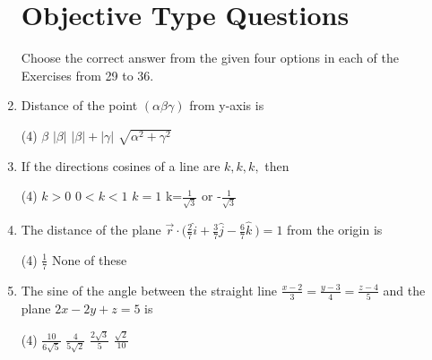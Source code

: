 \documentclass[12pt]{article}
\begin{document}
\begin{enumerate}
\section*{Objective Type Questions}
Choose the correct answer from the given four options in each of the Exercises from 29 to 36.

\item Distance of the point $(\alpha \beta \gamma)$ from y-axis is
\begin{tasks}(4)
	\task $\beta$ 
	\task $|\beta|$
	\task $|\beta|+|\gamma|$
	\task $\sqrt{\alpha^2+\gamma^2}$
\end{tasks}
\item If the directions cosines of a line are $k,k,k,$ then
\begin{tasks}(4)
	\task $k>0$
	\task $0<k<1$
	\task $k=1$
	\task k=\(\displaystyle \frac{1}{\sqrt{3}}\) or -\(\displaystyle \frac{1}{\sqrt{3}}\)
\end{tasks}
\item The distance of the plane $\overrightarrow{r} \cdot \Biggl(\displaystyle \frac{2}{7}\hat{i}+\frac{3}{7}\hat{j}-\frac{6}{7}\hat{k}\ \Biggr)=1$ from the origin is 
\begin{tasks}(4)
	\task \(\displaystyle \frac{1}{7}\)
	\task None of these	
\end{tasks}
\item The sine of the angle between the straight line \(\displaystyle \frac{x-2}{3}=\frac{y-3}{4}=\frac{z-4}{5}\) and the plane $2x-2y+z=5$ is
\begin{tasks}(4)
	\task \(\displaystyle \frac{10}{6\sqrt{5}}\)
	\task \(\displaystyle \frac{4}{5\sqrt{2}}\)
	\task \(\displaystyle \frac{2\sqrt{3}}{5}\)
	\task \(\displaystyle \frac{\sqrt{2}}{10}\)


\end{tasks}
\end{enumerate}
\end{document}
